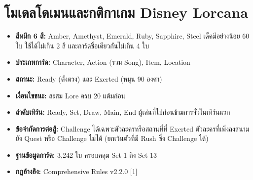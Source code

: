 \section{โมเดลโดเมนและกติกาเกม Disney Lorcana}

\begin{itemize}
    \item \textbf{สีหมึก 6 สี:} Amber, Amethyst, Emerald, Ruby, Sapphire, Steel เด็คมีอย่างน้อย 60 ใบ ใช้ได้ไม่เกิน 2 สี และการ์ดชื่อเดียวกันไม่เกิน 4 ใบ
    \item \textbf{ประเภทการ์ด:} Character, Action (รวม Song), Item, Location
    \item \textbf{สถานะ:} Ready (ตั้งตรง) และ Exerted (หมุน 90 องศา)
    \item \textbf{เงื่อนไขชนะ:} สะสม Lore ครบ 20 แต้มก่อน
    \item \textbf{ลำดับเทิร์น:} Ready, Set, Draw, Main, End ผู้เล่นที่ไปก่อนข้ามการจั่วในเทิร์นแรก
    \item \textbf{ข้อจำกัดการต่อสู้:} Challenge ได้เฉพาะตัวละครหรือสถานที่ที่ Exerted ตัวละครที่เพิ่งลงสนามยัง Quest หรือ Challenge ไม่ได้ (ยกเว้นตัวที่มี Rush ซึ่ง Challenge ได้)
    \item \textbf{ฐานข้อมูลการ์ด:} 3,242 ใบ ครอบคลุม Set 1 ถึง Set 13
    \item \textbf{กฎอ้างอิง:} Comprehensive Rules v2.2.0 [1]
\end{itemize}
